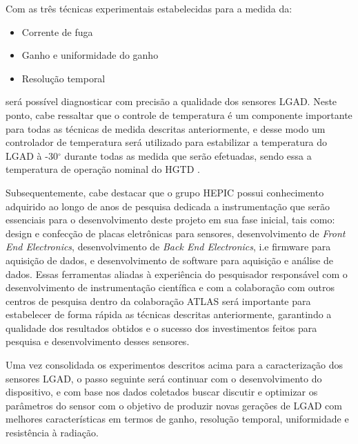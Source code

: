 
Com as três técnicas experimentais estabelecidas para a medida da:

\begin{itemize}
\item Corrente de fuga
\item Ganho e uniformidade do ganho
\item Resolução temporal 
\end{itemize}
será possível diagnosticar com precisão a qualidade dos sensores LGAD. Neste ponto, cabe ressaltar que o controle de temperatura é um componente importante para todas as técnicas de medida descritas anteriormente, e desse modo um controlador de temperatura será utilizado para estabilizar a temperatura do LGAD à -30$^{\circ}$ durante todas as medida que serão efetuadas, sendo essa a temperatura de operação nominal do HGTD \cite{tdr}.

Subsequentemente, cabe destacar que o grupo HEPIC possui conhecimento adquirido ao longo de anos de pesquisa dedicada a instrumentação que serão essenciais para o desenvolvimento deste projeto em sua fase inicial, tais como: design e confecção de placas eletrônicas para sensores, desenvolvimento de {\it Front End Electronics}, desenvolvimento de {\it Back End Electronics}, i.e firmware para aquisição de dados, e desenvolvimento de software para aquisição e análise de dados. Essas ferramentas aliadas à experiência do pesquisador responsável com o desenvolvimento de instrumentação científica \cite{tpcNIM,discharge_paper,GSI_REPO,THGEM} e com a colaboração com outros centros de pesquisa dentro da colaboração ATLAS será importante para estabelecer de forma rápida as técnicas descritas anteriormente, garantindo a qualidade dos resultados obtidos e o sucesso dos investimentos feitos para pesquisa e desenvolvimento desses sensores. 

Uma vez consolidada os experimentos descritos acima para a caracterização dos sensores LGAD, o passo seguinte será continuar com o desenvolvimento do dispositivo, e com base nos dados coletados buscar discutir e optimizar os parâmetros do sensor com o objetivo de produzir novas gerações de LGAD com melhores características em termos de ganho, resolução temporal, uniformidade e resistência à radiação. 


